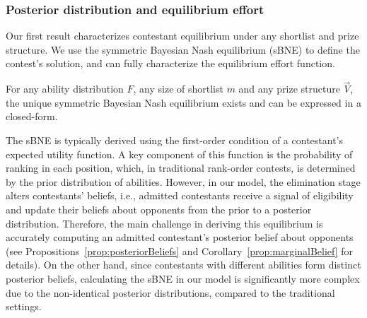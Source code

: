 \subsubsection{Posterior distribution and equilibrium effort}
Our first result characterizes contestant equilibrium under any shortlist and prize structure. We use the symmetric Bayesian Nash equilibrium (sBNE) to define the contest’s solution, and can fully characterize the equilibrium effort function. %

\begin{theorem}
    For any ability distribution $F$, any size of shortlist $m$ and any prize structure $\vec{V}$, the unique symmetric Bayesian Nash equilibrium exists and can be expressed in a closed-form.
\end{theorem}


The sBNE is typically derived using the first-order condition of a contestant's expected utility function. A key component of this function is the probability of ranking in each position, which, in traditional rank-order contests, is determined by the prior distribution of abilities. However, in our model, the elimination stage alters contestants' beliefs, i.e., admitted contestants receive a signal of eligibility and update their beliefs about opponents from the prior to a posterior distribution.
Therefore, the main challenge in deriving this equilibrium is accurately computing an admitted contestant’s posterior belief about opponents (see Propositions~\ref{prop:posteriorBeliefs} and Corollary~\ref{prop:marginalBelief} for details). On the other hand, since contestants with different abilities form distinct posterior beliefs, calculating the sBNE in our model is significantly more complex due to the non-identical posterior distributions, compared to the traditional settings.


